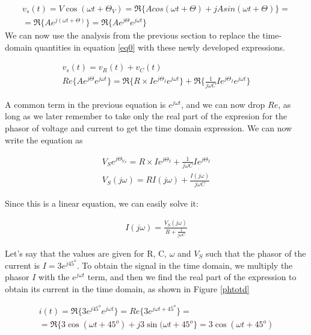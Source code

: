 \documentclass{ximera}
\begin{document}
\begin{eqnarray}
v_s(t)=  V \cos (\omega t + \Theta_V)=\Re\{ A cos (\omega t + \Theta ) + j A sin (\omega t + \Theta)\}= \nonumber \\ 
= \Re\{A e^{j(\omega t + \Theta)}\}=\Re\{A e^{j \Theta} e^{j \omega t}\} \label{eq2}
\end{eqnarray}
We can now use the analysis from the previous section to  replace the time-domain quantities in equation \ref{eq0} with
these newly developed expressions.



\begin{eqnarray}
v_s(t)=v_R(t) + v_C(t)  \\
Re\{A e^{j \Theta} e^{j \omega t}\}=    \Re\{R \times I e^{j \Theta_I} e^{j \omega t}\}   +  \Re\{   \frac{1}{j \omega C}  I e^{j \Theta_I}  e^{j \omega t}  \}
\end{eqnarray}

A common term in the previous equation is $ e^{j\omega t}$, and we can now drop $Re$, as long as we later remember to take only the real part of the expresion for the phasor of voltage and current to get the time domain expression. We can now
write the equation as




\begin{eqnarray}
 V_S  e^{j \Theta_{V_S}}  =R \times I e^{j \Theta_I}  +    \frac{1}{j \omega C}  I e^{j \Theta_I}  \\
V_S(j \omega)   = R I(j \omega)    + \frac{I(j \omega )}{j \omega C} 
\end{eqnarray}



Since this is a linear equation, we can easily solve it:


\begin{eqnarray}
I (j \omega) = \frac{V_S(j \omega)}{ R    + \frac{1}{j \omega C} } \label{pheq}
\end{eqnarray} 



Let's say that the values  are given for R, C,  $\omega$  and $V_S$ such that the phasor of the current is  $I=3 e^{j 45^o}$. To obtain the signal in the time domain,  we   multiply the phasor $I$ with the $ e^{j\omega t}$ term, and  then we find
the real part of the expression to obtain its current in the time domain, as shown in Figure \ref{phtotd}


\begin{eqnarray}
i(t) = \Re\{ 3 e^{j 45^o}  e^{j\omega t} \} =  Re\{3 e^{j \omega t + 45^o}  \} = \nonumber \\ = \Re \{ 3 \cos (\omega t + 45^o ) + j 3 \sin (\omega t + 45^o \} = 3  \cos (\omega t + 45^o ) \label{phtotd}
\end{eqnarray}
\end{document}
